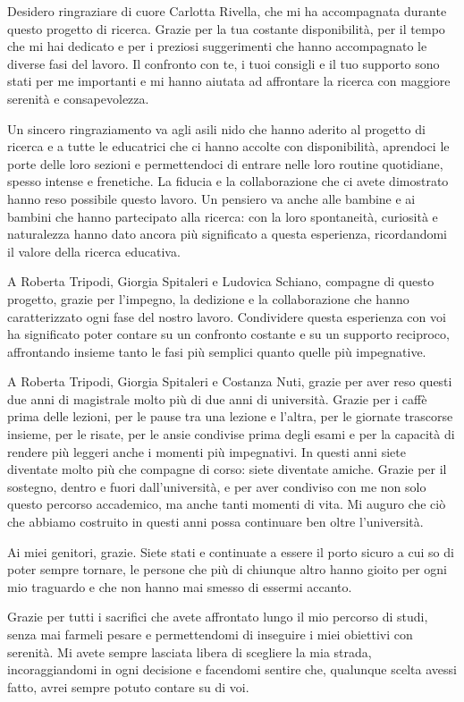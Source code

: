 Desidero ringraziare di cuore Carlotta Rivella, che mi ha accompagnata durante questo progetto di ricerca. Grazie per la tua costante disponibilità, per il tempo che mi hai dedicato e per i preziosi suggerimenti che hanno accompagnato le diverse fasi del lavoro. Il confronto con te, i tuoi consigli e il tuo supporto sono stati per me importanti e mi hanno aiutata ad affrontare la ricerca con maggiore serenità e consapevolezza.

Un sincero ringraziamento va agli asili nido che hanno aderito al progetto di ricerca e a tutte le educatrici che ci hanno accolte con disponibilità, aprendoci le porte delle loro sezioni e permettendoci di entrare nelle loro routine quotidiane, spesso intense e frenetiche. La fiducia e la collaborazione che ci avete dimostrato hanno reso possibile questo lavoro. Un pensiero va anche alle bambine e ai bambini che hanno partecipato alla ricerca: con la loro spontaneità, curiosità e naturalezza hanno dato ancora più significato a questa esperienza, ricordandomi il valore della ricerca educativa.

A Roberta Tripodi, Giorgia Spitaleri e Ludovica Schiano, compagne di questo progetto, grazie per l'impegno, la dedizione e la collaborazione che hanno caratterizzato ogni fase del nostro lavoro. Condividere questa esperienza con voi ha significato poter contare su un confronto costante e su un supporto reciproco, affrontando insieme tanto le fasi più semplici quanto quelle più impegnative.

A Roberta Tripodi, Giorgia Spitaleri e Costanza Nuti, grazie per aver reso questi due anni di magistrale molto più di due anni di università. Grazie per i caffè prima delle lezioni, per le pause tra una lezione e l'altra, per le giornate trascorse insieme, per le risate, per le ansie condivise prima degli esami e per la capacità di rendere più leggeri anche i momenti più impegnativi. In questi anni siete diventate molto più che compagne di corso: siete diventate amiche. Grazie per il sostegno, dentro e fuori dall'università, e per aver condiviso con me non solo questo percorso accademico, ma anche tanti momenti di vita. Mi auguro che ciò che abbiamo costruito in questi anni possa continuare ben oltre l'università.

Ai miei genitori, grazie. Siete stati e continuate a essere il porto sicuro a cui so di poter sempre tornare, le persone che più di chiunque altro hanno gioito per ogni mio traguardo e che non hanno mai smesso di essermi accanto.

Grazie per tutti i sacrifici che avete affrontato lungo il mio percorso di studi, senza mai farmeli pesare e permettendomi di inseguire i miei obiettivi con serenità. Mi avete sempre lasciata libera di scegliere la mia strada, incoraggiandomi in ogni decisione e facendomi sentire che, qualunque scelta avessi fatto, avrei sempre potuto contare su di voi.

